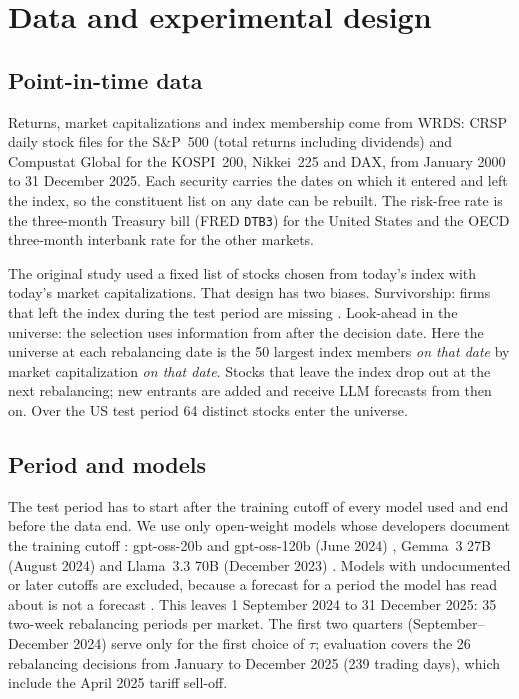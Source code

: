 \section{Data and experimental design}\label{sec:data}

\subsection{Point-in-time data}
Returns, market capitalizations and index membership come from WRDS: CRSP daily stock files for the S\&P~500 (total returns including dividends) and Compustat Global for the KOSPI~200, Nikkei~225 and DAX, from January 2000 to 31 December 2025. Each security carries the dates on which it entered and left the index, so the constituent list on any date can be rebuilt. The risk-free rate is the three-month Treasury bill (FRED \texttt{DTB3}) for the United States and the OECD three-month interbank rate for the other markets.

The original study used a fixed list of stocks chosen from today's index with today's market capitalizations. That design has two biases. Survivorship: firms that left the index during the test period are missing \citep{brown1992survivorship,elton1996survivorship}. Look-ahead in the universe: the selection uses information from after the decision date. Here the universe at each rebalancing date is the 50 largest index members \emph{on that date} by market capitalization \emph{on that date}. Stocks that leave the index drop out at the next rebalancing; new entrants are added and receive LLM forecasts from then on. Over the US test period 64 distinct stocks enter the universe.

\subsection{Period and models}
The test period has to start after the training cutoff of every model used and end before the data end. We use only open-weight models whose developers document the training cutoff : gpt-oss-20b and gpt-oss-120b (June 2024) \citep{openai2025gptoss}, Gemma~3 27B (August 2024) \citep{team2025gemma3} and Llama~3.3 70B (December 2023) \citep{meta2024llama33}. Models with undocumented or later cutoffs are excluded, because a forecast for a period the model has read about is not a forecast \citep{glasserman2023assessing,sarkar2024lookahead}. This leaves 1 September 2024 to 31 December 2025: 35 two-week rebalancing periods per market. The first two quarters (September--December 2024) serve only for the first choice of $\tau$; evaluation covers the 26 rebalancing decisions from January to December 2025 (239 trading days), which include the April 2025 tariff sell-off.

